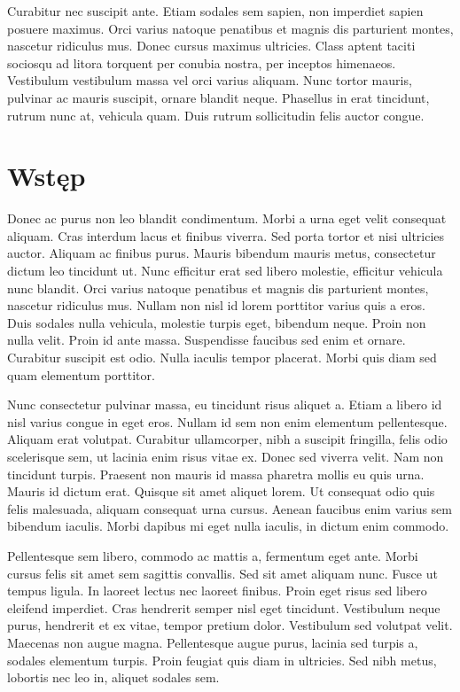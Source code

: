 \documentclass[polish,engineering]{wizthesis}
\begin{document}
Curabitur nec suscipit ante. Etiam sodales sem sapien, non imperdiet sapien posuere maximus. Orci varius natoque penatibus et magnis dis parturient montes, nascetur ridiculus mus. Donec cursus maximus ultricies. 
Class aptent taciti sociosqu ad litora torquent per conubia nostra, per inceptos himenaeos. Vestibulum vestibulum massa vel orci varius aliquam. Nunc tortor mauris, pulvinar ac mauris suscipit, ornare blandit neque. Phasellus in erat tincidunt, rutrum nunc at, vehicula quam. Duis rutrum sollicitudin felis auctor congue.

\tableofcontents

\chapter{Wstęp}

Donec ac purus non leo blandit condimentum. Morbi a urna eget velit consequat aliquam. Cras interdum lacus et finibus viverra. Sed porta tortor et nisi ultricies auctor. Aliquam ac finibus purus. Mauris bibendum mauris metus, consectetur dictum leo tincidunt ut. Nunc efficitur erat sed libero molestie, efficitur vehicula nunc blandit.
Orci varius natoque penatibus et magnis dis parturient montes, nascetur ridiculus mus. Nullam non nisl id lorem porttitor varius quis a eros. Duis sodales nulla vehicula, molestie turpis eget, bibendum neque. Proin non nulla velit. Proin id ante massa. Suspendisse faucibus sed enim et ornare. Curabitur suscipit est odio. Nulla iaculis tempor placerat. Morbi quis diam sed quam elementum porttitor.

Nunc consectetur pulvinar massa, eu tincidunt risus aliquet a. Etiam a libero id nisl varius congue in eget eros. Nullam id sem non enim elementum pellentesque. Aliquam erat volutpat. Curabitur ullamcorper, nibh a suscipit fringilla, felis odio scelerisque sem, ut lacinia enim risus vitae ex. Donec sed viverra velit. Nam non tincidunt turpis.
Praesent non mauris id massa pharetra mollis eu quis urna. Mauris id dictum erat. Quisque sit amet aliquet lorem. Ut consequat odio quis felis malesuada, aliquam consequat urna cursus. Aenean faucibus enim varius sem bibendum iaculis. Morbi dapibus mi eget nulla iaculis, in dictum enim commodo.

Pellentesque sem libero, commodo ac mattis a, fermentum eget ante. Morbi cursus felis sit amet sem sagittis convallis. Sed sit amet aliquam nunc. Fusce ut tempus ligula. In laoreet lectus nec laoreet finibus. Proin eget risus sed libero eleifend imperdiet.
Cras hendrerit semper nisl eget tincidunt. Vestibulum neque purus, hendrerit et ex vitae, tempor pretium dolor. Vestibulum sed volutpat velit. Maecenas non augue magna. Pellentesque augue purus, lacinia sed turpis a, sodales elementum turpis. Proin feugiat quis diam in ultricies. Sed nibh metus, lobortis nec leo in, aliquet sodales sem.
\end{document}
